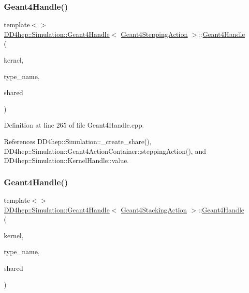 \subsubsection{\texorpdfstring{Geant4\+Handle()}{Geant4Handle()}\hspace{0.1cm}{\footnotesize\ttfamily [17/20]}}
{\footnotesize\ttfamily template$<$$>$ \\
\hyperlink{class_d_d4hep_1_1_simulation_1_1_geant4_handle}{D\+D4hep\+::\+Simulation\+::\+Geant4\+Handle}$<$ \hyperlink{class_d_d4hep_1_1_simulation_1_1_geant4_stepping_action}{Geant4\+Stepping\+Action} $>$\+::\hyperlink{class_d_d4hep_1_1_simulation_1_1_geant4_handle}{Geant4\+Handle} (\begin{DoxyParamCaption}\item[{\hyperlink{class_d_d4hep_1_1_simulation_1_1_geant4_kernel}{Geant4\+Kernel} \&}]{kernel,  }\item[{const char $\ast$}]{type\+\_\+name,  }\item[{bool}]{shared }\end{DoxyParamCaption})}



Definition at line 265 of file Geant4\+Handle.\+cpp.



References D\+D4hep\+::\+Simulation\+::\+\_\+create\+\_\+share(), D\+D4hep\+::\+Simulation\+::\+Geant4\+Action\+Container\+::stepping\+Action(), and D\+D4hep\+::\+Simulation\+::\+Kernel\+Handle\+::value.

\hypertarget{class_d_d4hep_1_1_simulation_1_1_geant4_handle_ae208c5c7c92cb3f5ecf288633a52f30c}{}\label{class_d_d4hep_1_1_simulation_1_1_geant4_handle_ae208c5c7c92cb3f5ecf288633a52f30c} 
\subsubsection{\texorpdfstring{Geant4\+Handle()}{Geant4Handle()}\hspace{0.1cm}{\footnotesize\ttfamily [18/20]}}
{\footnotesize\ttfamily template$<$$>$ \\
\hyperlink{class_d_d4hep_1_1_simulation_1_1_geant4_handle}{D\+D4hep\+::\+Simulation\+::\+Geant4\+Handle}$<$ \hyperlink{class_d_d4hep_1_1_simulation_1_1_geant4_stacking_action}{Geant4\+Stacking\+Action} $>$\+::\hyperlink{class_d_d4hep_1_1_simulation_1_1_geant4_handle}{Geant4\+Handle} (\begin{DoxyParamCaption}\item[{\hyperlink{class_d_d4hep_1_1_simulation_1_1_geant4_kernel}{Geant4\+Kernel} \&}]{kernel,  }\item[{const string \&}]{type\+\_\+name,  }\item[{bool}]{shared }\end{DoxyParamCaption})}



